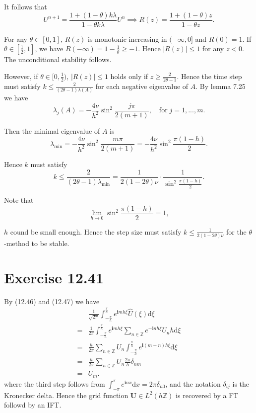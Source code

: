 \documentclass[twocolumn,10pt]{article}
\begin{document}
It follows that
\begin{equation*}
    U^{n+1}=\frac{1+(1-\theta)k\lambda}{1-\theta k\lambda}U^n  \implies  R(z)=\frac{1+(1-\theta)z}{1-\theta z}.
\end{equation*}

For any $\theta\in[0,1]$, $R(z)$ is monotonic increasing in $(-\infty,0]$ and $R(0)=1$. If $\theta\in[\frac{1}{2},1]$, we have $R(-\infty)=1-\frac{1}{\theta}\geq -1$. Hence $|R(z)|\leq 1$ for any $z<0$. The unconditional stability follows.

However, if $\theta\in[0,\frac{1}{2})$, $|R(z)|\leq 1$ holds only if $z\geq \frac{2}{2\theta-1}$. Hence the time step must satisfy $k\leq \frac{2}{(2\theta-1)\lambda(A)}$ for each negative eigenvalue of $A$. By lemma 7.25 we have
\begin{equation*}
    \lambda_j(A)=-\frac{4\nu}{h^2}\sin^2\frac{j\pi}{2(m+1)},\quad \text{for}\; j=1,...,m.
\end{equation*}

Then the minimal eigenvalue of $A$ is
\begin{equation*}
    \lambda_\text{min}=-\frac{4\nu}{h^2}\sin^2\frac{m\pi}{2(m+1)}=-\frac{4\nu}{h^2}\sin^2\frac{\pi(1-h)}{2}.
\end{equation*}

Hence $k$ must satisfy
\begin{equation*}
    k\leq \frac{2}{(2\theta-1)\lambda_\text{min}} = \frac{1}{2(1-2\theta)\nu} \cdot \frac{1}{\sin^2\frac{\pi(1-h)}{2}}.
\end{equation*}

Note that
\begin{equation*}
    \lim_{h\to 0} \sin^2\frac{\pi(1-h)}{2} = 1, 
\end{equation*}

$h$ cound be small enough. Hence the step size must satisfy $k\leq \frac{1}{2(1-2\theta)\nu}$ for the $\theta$-method to be stable.

\section*{\large Exercise 12.41}

 By (12.46) and (12.47) we have
\begin{align*}
    & \frac{1}{\sqrt{2\pi}} \int_{-\frac{\pi}{h}}^{\frac{\pi}{h}} e^{\mathbf{i}mh\xi}\hat{U}(\xi) \text{d}\xi\\
    =& \frac{1}{2\pi} \int_{-\frac{\pi}{h}}^{\frac{\pi}{h}} e^{\mathbf{i}mh\xi}\sum_{n\in\mathbb{Z}} e^{-\mathbf{i}nh\xi}U_nh \text{d}\xi\\
    =& \frac{h}{2\pi} \sum_{n\in\mathbb{Z}} U_n \int_{-\frac{\pi}{h}}^{\frac{\pi}{h}} e^{\mathbf{i}(m-n)h\xi} \text{d}\xi\\
    =& \frac{h}{2\pi} \sum_{n\in\mathbb{Z}} U_n \frac{2\pi}{h}\delta_{nm}\\
    =& U_m.
\end{align*}
where the third step follows from $\int_{-\pi}^{\pi} e^{\textbf{i}nx}\text{d} x=2\pi \delta_{n0}$, and the notation $\delta_{ij}$ is the Kronecker delta. Hence the grid function $\mathbf{U}\in L^2(h\mathbb{Z})$ is recovered by a FT followd by an IFT. 
\end{document}
